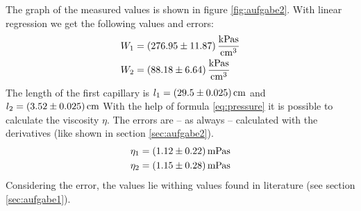 The graph of the measured values is shown in figure \ref{fig:aufgabe2}. With linear regression we get the following values and errors:
\begin{align*}
W_1 &= \unit[(276.95 \pm 11.87)]{\frac{kPa s}{cm^3}}\\
W_2 &= \unit[(88.18 \pm 6.64)]{\frac{kPa s}{cm^3}}
\end{align*}
The length of the first capillary is $l_1 = \unit[(29.5 \pm 0.025)]{cm}$ and $l_2 = \unit[(3.52 \pm 0.025)]{cm}$
With the help of formula \ref{eq:pressure} it is possible to calculate the viscosity $\eta$. The errors are -- as always -- calculated with the derivatives (like shown in section \ref{sec:aufgabe2}).
\begin{align*}
\eta_1 &= \unit[(1.12 \pm 0.22)]{mPa s}   \\
\eta_2 &= \unit[(1.15 \pm 0.28)]{mPa s}
\end{align*}
Considering the error, the values lie withing values found in literature (see section \ref{sec:aufgabe1}).




